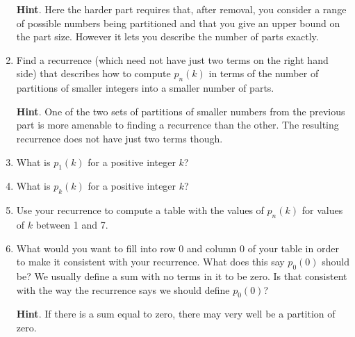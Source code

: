 \documentclass{book}
\begin{document}
\begin{activity}
\begin{enumerate}[font=\bfseries,label=(\alph*),ref=\alph*]
\par\smallskip%
\noindent\textbf{Hint}.\hypertarget{hint-136}{}\quad%
\hypertarget{p-1150}{}%
Here the harder part requires that, after removal, you consider a range of possible numbers being partitioned and that you give an upper bound on the part size. However it lets you describe the number of parts exactly.%
\par\smallskip%
\noindent\item\label{task-220} \hypertarget{p-1153}{}%
Find a recurrence (which need not have just two terms on the right hand side) that describes how to compute \(p_n(k)\) in terms of the number of partitions of smaller integers into a smaller number of parts.%
\par\smallskip%
\noindent\textbf{Hint}.\hypertarget{hint-137}{}\quad%
\hypertarget{p-1154}{}%
One of the two sets of partitions of smaller numbers from the previous part is more amenable to finding a recurrence than the other. The resulting recurrence does not have just two terms though.%
\par\smallskip%
\noindent\item\label{task-221} \hypertarget{p-1156}{}%
What is \(p_1(k)\) for a positive integer \(k\)?%
\par\smallskip%
\noindent\item\label{task-222} \hypertarget{p-1158}{}%
What is \(p_k(k)\) for a positive integer \(k\)?%
\par\smallskip%
\noindent\item\label{task-223} \hypertarget{p-1160}{}%
Use your recurrence to compute a table with the values of \(p_n(k)\) for values of \(k\) between 1 and 7.%
\par\smallskip%
\noindent\item\label{task-224} \hypertarget{p-1161}{}%
What would you want to fill into row 0 and column 0 of your table in order to make it consistent with your recurrence.  What does this say \(p_0(0)\) should be?  We usually define a sum with no terms in it to be zero. Is that consistent with the way the recurrence says we should define \(p_0(0)\)?%
\par\smallskip%
\noindent\textbf{Hint}.\hypertarget{hint-138}{}\quad%
\hypertarget{p-1162}{}%
If there is a sum equal to zero, there may very well be a partition of zero.%
\par\smallskip%
\noindent\end{enumerate}
\end{activity}

\clearpage
\end{document}
